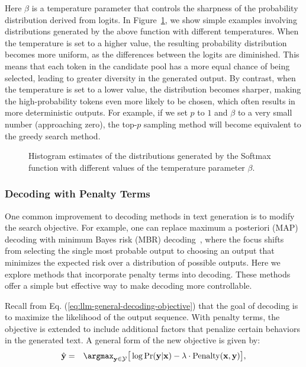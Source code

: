 \noindent Here $\beta$ is a temperature parameter that controls the sharpness of the probability distribution derived from logits. In Figure~\ref{fig:llm-softmax-with-temperature}, we show simple examples involving distributions generated by the above function with different temperatures. When the temperature is set to a higher  value, the resulting probability distribution becomes more uniform, as the differences between the logits are diminished. This means that each token in the candidate pool has a more equal chance of being selected, leading to greater diversity in the generated output. By contrast, when the temperature is set to a lower value, the distribution becomes sharper, making the high-probability tokens even more likely to be chosen, which often results in more deterministic outputs. For example, if we set $p$ to $1$ and $\beta$ to a very small number (approaching zero), the top-$p$ sampling method will become equivalent to the greedy search method.

\begin{figure}[!t]
\centering

\vspace{-0.5cm} \caption{Histogram estimates of the distributions generated by the Softmax function with different values of the temperature parameter $\beta$.}
\label{fig:llm-softmax-with-temperature}
\end{figure}


\subsubsection{Decoding with Penalty Terms}

One common improvement to decoding methods in text generation is to modify the search objective. For example, one can replace maximum a posteriori (MAP) decoding with minimum Bayes risk (MBR) decoding~\cite{kumar-etal:2004minimum}, where the focus shifts from selecting the single most probable output to choosing an output that minimizes the expected risk over a distribution of possible outputs. Here we explore methods that incorporate penalty terms into decoding. These methods offer a simple but effective way to make decoding more controllable.

Recall from Eq. (\ref{eq:llm-general-decoding-objective}) that the goal of decoding is to maximize the likelihood of the output sequence. With penalty terms, the objective is extended to include additional factors that penalize certain behaviors in the generated text. A general form of the new objective is given by:
\begin{eqnarray}
\hat{\mathbf{y}} & = & \argmax_{\mathbf{y} \in \mathcal{Y}} \big[ \log \Pr(\mathbf{y}|\mathbf{x}) - \lambda \cdot \mathrm{Penalty}(\mathbf{x},\mathbf{y}) \big], \label{eq:llm-decoding-objective-with-penalty}
\end{eqnarray}

